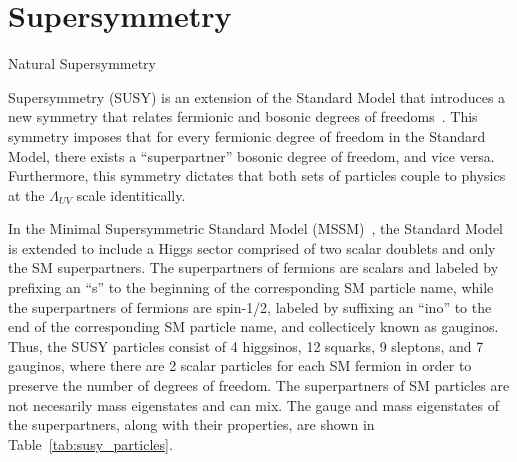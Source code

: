 \chapter{Supersymmetry}
\begin{section}{Natural Supersymmetry}

Supersymmetry (SUSY) is an extension of the Standard Model that introduces a new symmetry that relates fermionic and bosonic degrees of freedoms~\cite{ref:hierarchy1,ref:hierarchy2,Ramond:1971gb,Golfand:1971iw,Neveu:1971rx,Volkov:1972jx,Wess:1973kz,Wess:1974tw,Fayet:1974pd,Nilles:1983ge}.
This symmetry imposes that for every fermionic degree of freedom in the Standard Model, there exists a ``superpartner'' bosonic degree of freedom, and vice versa.
Furthermore, this symmetry dictates that both sets of particles couple to physics at the $\Lambda_{UV}$ scale identitically.

In the Minimal Supersymmetric Standard Model (MSSM)~\cite{Csaki:1996ks}, the Standard Model is extended to include a Higgs sector comprised of two scalar doublets and only the SM superpartners.
The superpartners of fermions are scalars and labeled by prefixing an ``s'' to the beginning of the corresponding SM particle name, while the superpartners of fermions are spin-1/2, labeled by suffixing an ``ino'' to the end of the corresponding SM particle name, and collecticely known as gauginos.
Thus, the SUSY particles consist of 4 higgsinos, 12 squarks, 9 sleptons, and 7 gauginos, where there are 2 scalar particles for each SM fermion in order to preserve the number of degrees of freedom.
The superpartners of SM particles are not necesarily mass eigenstates and can mix.
The gauge and mass eigenstates of the superpartners, along with their properties, are shown in Table~\ref{tab:susy_particles}.


\end{section}
